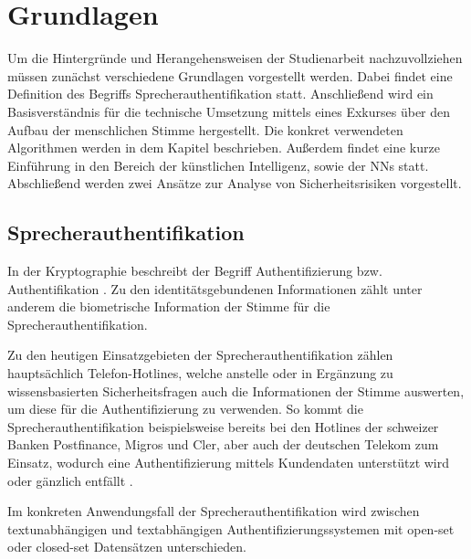 \section{Grundlagen}

\textauthor{\vJB,}{\vLB,}{\vHS}

Um die Hintergründe und Herangehensweisen der Studienarbeit nachzuvollziehen müssen zunächst verschiedene Grundlagen vorgestellt werden.
Dabei findet eine Definition des Begriffs Sprecherauthentifikation statt.
Anschließend wird ein Basisverständnis für die technische Umsetzung mittels eines Exkurses über den Aufbau der menschlichen Stimme hergestellt.
Die konkret verwendeten Algorithmen werden in dem Kapitel  beschrieben.
Außerdem findet eine kurze Einführung in den Bereich der künstlichen Intelligenz, sowie der \acp{NN} statt.
Abschließend werden zwei Ansätze zur Analyse von Sicherheitsrisiken vorgestellt.

\subsection{Sprecherauthentifikation}

\textauthor{\vHS}{}{}

In der Kryptographie beschreibt der Begriff Authentifizierung bzw. Authentifikation  \autocite[][S. 129]{tsolkas_rollen_2017}.
Zu den identitätsgebundenen Informationen zählt unter anderem die biometrische Information der Stimme für die Sprecherauthentifikation.

Zu den heutigen Einsatzgebieten der Sprecherauthentifikation zählen hauptsächlich Telefon-Hotlines, welche anstelle oder in Ergänzung zu wissensbasierten Sicherheitsfragen auch die Informationen der Stimme auswerten, um diese für die Authentifizierung zu verwenden.
So kommt die Sprecherauthentifikation beispielsweise bereits bei den Hotlines der schweizer Banken Postfinance, Migros und Cler, aber auch der deutschen Telekom zum Einsatz, wodurch eine Authentifizierung mittels Kundendaten unterstützt wird oder gänzlich entfällt \autocite[vgl.][]{anz_mit_2023} \autocite[vgl.][]{noauthor_authentifizierung_nodate} \autocite[vgl.][]{noauthor_meine_nodate}.

Im konkreten Anwendungsfall der Sprecherauthentifikation wird zwischen textunabhängigen und textabhängigen Authentifizierungssystemen mit open-set oder closed-set Datensätzen unterschieden.

